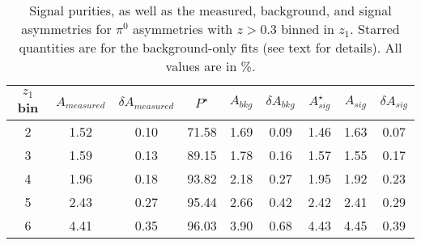\begin{table}[H]\footnotesize
\centering
\begin{tabular}{|c|c|c|c|c|c|c|c|c|}
\hline
$z_1$ bin & $A_{measured}$ & $\delta A_{measured}$ & $P^{\star}$  & $A_{bkg}$ & $\delta A_{bkg}$ & $A_{sig}^{\star}$ & $ A_{sig}$  & $\delta A_{sig}$ \\ \hline\hline
2 & 1.52 & 0.10 & 71.58 & 1.69 & 0.09 & 1.46 & 1.63 & 0.07 \\ \hline 
3 & 1.59 & 0.13 & 89.15 & 1.78 & 0.16 & 1.57 & 1.55 & 0.17 \\ \hline 
4 & 1.96 & 0.18 & 93.82 & 2.18 & 0.27 & 1.95 & 1.92 & 0.23 \\ \hline 
5 & 2.43 & 0.27 & 95.44 & 2.66 & 0.42 & 2.42 & 2.41 & 0.29 \\ \hline 
6 & 4.41 & 0.35 & 96.03 & 3.90 & 0.68 & 4.43 & 4.45 & 0.39 \\ \hline 
\end{tabular}
\caption[BG-correction quantities for $\pi^0$ asymmetries with $z>0.3$, $z_1$ bins]{Signal purities, as well as the measured, background, and signal asymmetries for $\pi^0$ asymmetries with $z>0.3$ binned in $z_1$. Starred quantities are for the background-only fits (see text for details). All values are in \%.}
\label{tab:pi0sinzbkgcor}
\end{table}

